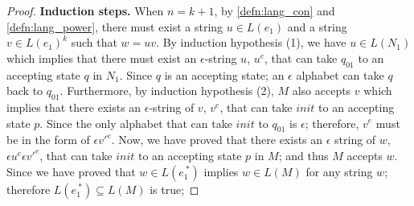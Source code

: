 \begin{proof}
\par \quad \textbf{Induction steps.} \quad When \(n = k + 1\), by
\autoref{defn:lang_con} and \autoref{defn:lang_power}, there must
exist a string \(u \in L(e_1)\) and a string \(v \in L(e_1)^k\) such
that \(w=uv\). By induction hypothesis (1), we have \(u
\in L(N_1)\) which implies that there must exist an \(\epsilon\)-string
\(u\), \(u^e\), that can take \(q_{01}\) to an accepting state \(q\)
in \(N_1\). Since \(q\) is an accepting state; an \(\epsilon\)
alphabet can take \(q\) back to \(q_{01}\). Furthermore, by induction
hypothesis (2), \(M\) also accepts \(v\) which implies that there
exists an \(\epsilon\)-string of \(v\), \(v^e\), that can take
\(init\) to an accepting state \(p\). Since the only
alphabet that can take \(init\) to \(q_{01}\) is \(\epsilon\); therefore,
\(v^e\) must be in the form of \(\epsilon v'^e\). Now, we have proved
that there exists an \(\epsilon\) string of \(w\), \(\epsilon u^e\epsilon v'^e\), that can
take \(init\) to an accepting state \(p\) in \(M\); and thus \(M\)
accepts \(w\). Since we have proved that \(w \in L(e_1^{\ *})\) implies
\(w \in L(M)\) for any string \(w\); therefore \(L(e_1^{\ *}) \subseteq L(M)\) is true; 


\end{proof}
